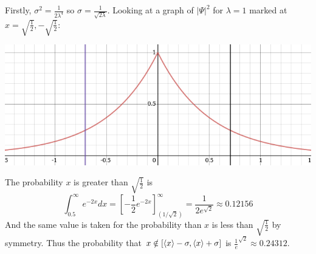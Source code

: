 \documentclass{article}
\begin{document}
\begin{enumerate}[label=(\alph*)]
      Firstly, $\sigma^2 = \frac1{2\lambda^4}$ so $\sigma = \frac1{\sqrt{2\lambda}}$. Looking at a graph of $|\Psi|^2$ for $\lambda = 1$ marked at $x=\sqrt{\frac12}, -\sqrt{\frac12}$:

      \centerline{\includegraphics[width=6in]{1-5c.png}}

      The probability $x$ is greater than $\sqrt{\frac12}$ is
      \[\int_{0.5}^\infty e^{-2x}dx = [-\frac12e^{-2x}]_{(1/\sqrt{2})}^{\infty} = \frac1{2e^{\sqrt2}} \approx 0.12156 \] 
      And the same value is taken for the probability than $x$ is less than $\sqrt{\frac12}$ by symmetry.
      Thus the probability that $x \notin [\braket{x} - \sigma, \braket{x} + \sigma]$ is $\frac1e^{\sqrt{2}} \approx 0.24312$.
  \end{enumerate}
\end{document}
